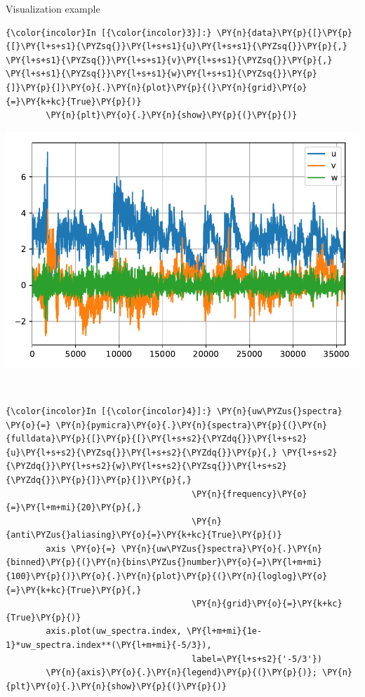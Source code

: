 
\begin{exampleblock}{Visualization example}
    \begin{Verbatim}[commandchars=\\\{\}]
{\color{incolor}In [{\color{incolor}3}]:} \PY{n}{data}\PY{p}{[}\PY{p}{[}\PY{l+s+s1}{\PYZsq{}}\PY{l+s+s1}{u}\PY{l+s+s1}{\PYZsq{}}\PY{p}{,} \PY{l+s+s1}{\PYZsq{}}\PY{l+s+s1}{v}\PY{l+s+s1}{\PYZsq{}}\PY{p}{,} \PY{l+s+s1}{\PYZsq{}}\PY{l+s+s1}{w}\PY{l+s+s1}{\PYZsq{}}\PY{p}{]}\PY{p}{]}\PY{o}{.}\PY{n}{plot}\PY{p}{(}\PY{n}{grid}\PY{o}{=}\PY{k+kc}{True}\PY{p}{)}
        \PY{n}{plt}\PY{o}{.}\PY{n}{show}\PY{p}{(}\PY{p}{)}
\end{Verbatim}


    \begin{center}
    \includegraphics[width=.83\columnwidth]{pprog/uvw.pdf}
    \end{center}
    { \hspace*{\fill} \\}
    
    \begin{Verbatim}[commandchars=\\\{\}]
{\color{incolor}In [{\color{incolor}4}]:} \PY{n}{uw\PYZus{}spectra} \PY{o}{=} \PY{n}{pymicra}\PY{o}{.}\PY{n}{spectra}\PY{p}{(}\PY{n}{fulldata}\PY{p}{[}\PY{p}{[}\PY{l+s+s2}{\PYZdq{}}\PY{l+s+s2}{u}\PY{l+s+s2}{\PYZsq{}}\PY{l+s+s2}{\PYZdq{}}\PY{p}{,} \PY{l+s+s2}{\PYZdq{}}\PY{l+s+s2}{w}\PY{l+s+s2}{\PYZsq{}}\PY{l+s+s2}{\PYZdq{}}\PY{p}{]}\PY{p}{]}\PY{p}{,} 
                                     \PY{n}{frequency}\PY{o}{=}\PY{l+m+mi}{20}\PY{p}{,}
                                     \PY{n}{anti\PYZus{}aliasing}\PY{o}{=}\PY{k+kc}{True}\PY{p}{)}
        axis \PY{o}{=} \PY{n}{uw\PYZus{}spectra}\PY{o}{.}\PY{n}{binned}\PY{p}{(}\PY{n}{bins\PYZus{}number}\PY{o}{=}\PY{l+m+mi}{100}\PY{p}{)}\PY{o}{.}\PY{n}{plot}\PY{p}{(}\PY{n}{loglog}\PY{o}{=}\PY{k+kc}{True}\PY{p}{,}
                                     \PY{n}{grid}\PY{o}{=}\PY{k+kc}{True}\PY{p}{)}
        axis.plot(uw_spectra.index, \PY{l+m+mi}{1e-1}*uw_spectra.index**(\PY{l+m+mi}{-5/3}),
                                     label=\PY{l+s+s2}{'-5/3'})
        \PY{n}{axis}\PY{o}{.}\PY{n}{legend}\PY{p}{(}\PY{p}{)}; \PY{n}{plt}\PY{o}{.}\PY{n}{show}\PY{p}{(}\PY{p}{)}
\end{Verbatim}



\end{exampleblock}
